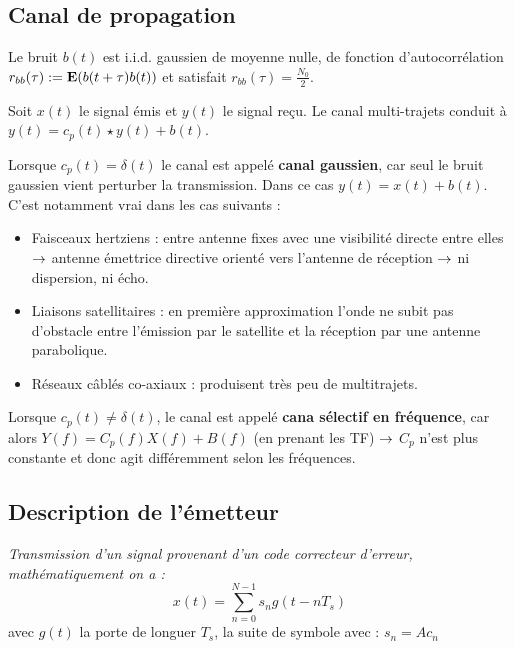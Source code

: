 \subsection{Canal de propagation}

	\begin{hyp}
		Le bruit $b(t)$ est i.i.d. gaussien de moyenne nulle, de fonction d'autocorrélation $r_{bb}(\tau) := \mathbf{E}(b(t + \tau) b(t))$ et satisfait $r_{bb}(\tau) = \frac{N_0}{2}$.
	\end{hyp}
	
	\begin{pop}
		Soit $x(t)$ le signal émis et $y(t)$ le signal reçu.
		Le canal multi-trajets conduit à $y(t) = c_p(t) \star y(t) + b(t)$.
	\end{pop}
	
	Lorsque $c_p(t) = \delta(t)$ le canal est appelé \textbf{canal gaussien}, car seul le bruit gaussien vient perturber la transmission.
	Dans ce cas $y(t) = x(t) + b(t)$.
	C'est notamment vrai dans les cas suivants :
	\begin{itemize}
	\item[\textbullet] Faisceaux hertziens : entre antenne fixes avec une visibilité directe entre elles $\rightarrow$ antenne émettrice directive orienté vers l'antenne de réception $\rightarrow$ ni dispersion, ni écho.
	\item[\textbullet] Liaisons satellitaires : en première approximation l'onde ne subit pas d'obstacle entre l'émission par le satellite et la réception par une antenne parabolique.
	\item[\textbullet] Réseaux câblés co-axiaux : produisent très peu de multitrajets.
	\end{itemize}
	
	Lorsque $c_p(t) \neq \delta(t)$, le canal est appelé \textbf{cana sélectif en fréquence}, car alors $Y(f) = C_p(f) X(f) + B(f)$ (en prenant les TF) $\rightarrow$ $C_p$ n'est plus constante et donc agit différemment selon les fréquences.
		

\subsection{Description de l'émetteur}

\begin{defn}
\textit{Transmission d'un signal provenant d'un code correcteur d'erreur, mathématiquement on a : }
$$x(t)=\sum_{n=0}^{N-1} s_{n}g(t-nT_{s})$$
avec $g(t)$ la porte de longuer $T_{s}$, la suite de symbole avec : $s_{n}=Ac_{n}$
\end{defn}

